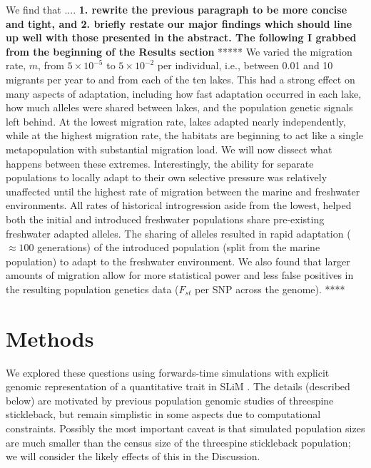 \documentclass{article}
\newcommand{\plr}[1]{\todo[linecolor=blue,backgroundcolor=blue!25,bordercolor=blue]{#1}}
\begin{document}
We find that .... \textbf{1. rewrite the previous paragraph to be more concise and tight, and 2. briefly restate our major findings which should line up well with those presented in the abstract. The following I grabbed from the beginning of the Results section}
*****
We varied the migration rate, $m$, from $5 \times 10^{-5}$ to $5 \times 10^{-2}$ per individual, i.e., between 0.01 and 10 migrants per year to and from each of the ten lakes. This had a strong effect on many aspects of adaptation, including how fast adaptation occurred in each lake, how much alleles were shared between lakes,
and the population genetic signals left behind. At the lowest migration rate, lakes adapted nearly independently, while at the highest migration rate, the habitats are beginning to act like a single metapopulation with substantial migration load. We will now dissect what happens between these extremes. Interestingly, the ability for separate populations to locally adapt to their own selective pressure was relatively unaffected until the highest rate of migration between the marine and freshwater environments. All rates of historical introgression aside from the lowest, helped both the initial and introduced freshwater populations share pre-existing freshwater adapted alleles. The sharing of alleles resulted in rapid adaptation ($\approx 100$ generations) of the introduced population (split from the marine population) to adapt to the freshwater environment. We also found that larger amounts of migration allow for more statistical power and less false positives in the resulting population genetics data ($F_{st}$ per SNP across the genome).
****


\section*{Methods}

We explored these questions using forwards-time simulations with explicit genomic representation of a quantitative trait in SLiM \citep{haller2017slim}. 
The details (described below) are motivated by previous population genomic studies of threespine stickleback, but remain simplistic in some aspects due to computational constraints.
Possibly the most important caveat is that simulated population sizes are much smaller than the census size of the threespine stickleback population;
we will consider the likely effects of this in the Discussion. \plr{TODO}
\end{document}
